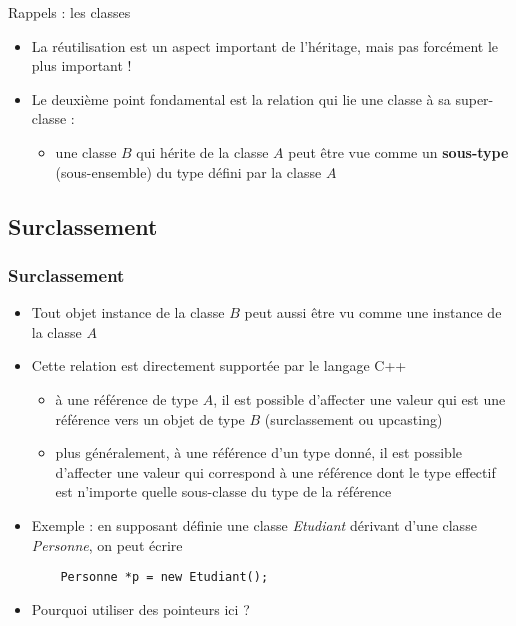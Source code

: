 
\begin{frame}{Rappels : les classes}
\begin{itemize}
	\item La réutilisation est un aspect important de l'héritage, mais pas forcément le plus important !
	\item Le deuxième point fondamental est la relation qui lie une classe à sa super-classe :
	\begin{itemize}
		\item une classe $B$ qui hérite de la classe $A$ peut être vue comme un \textbf{sous-type} (sous-ensemble) du type défini par la classe $A$
	\end{itemize}
\end{itemize}
\end{frame}

\subsection{Surclassement}

\begin{frame}[fragile]\frametitle{Surclassement}
\begin{itemize}
	\item Tout objet instance de la classe $B$ peut aussi être vu comme une instance de la classe $A$
	\item Cette relation est directement supportée par le langage C++
	\begin{itemize}
		\item à une référence de type $A$, il est possible d'affecter une valeur qui est une référence vers un objet de type $B$ (surclassement ou upcasting)
		\item plus généralement, à une référence d'un type donné, il est possible d'affecter une valeur qui correspond à une référence dont le type effectif est n'importe quelle sous-classe du type de la référence
	\end{itemize}
	\item Exemple : en supposant définie une classe \textit{Etudiant} dérivant d'une classe \textit{Personne}, on peut écrire
	\begin{lstlisting}
	Personne *p = new Etudiant();
	\end{lstlisting}
	\item Pourquoi utiliser des pointeurs ici ?
\end{itemize}
\end{frame}

